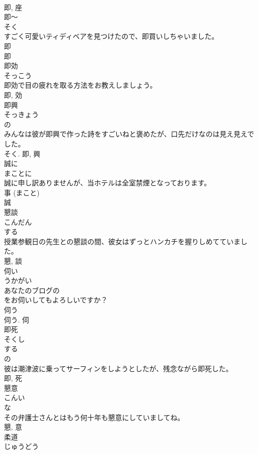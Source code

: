 \documentclass[8pt]{extreport}
\begin{document}
\begin{CJK}{UTF8}{min}
\\	即, 座	
\\	即〜	
\\	そく	
\\	すごく可愛いティディベアを見つけたので、即買いしちゃいました。	
\\	即 
\\	即	
\\	即効	
\\	そっこう	
\\	即効で目の疲れを取る方法をお教えしましょう。	
\\	即, 効	
\\	即興	
\\	そっきょう	
\\	の 
\\	みんなは彼が即興で作った詩をすごいねと褒めたが、口先だけなのは見え見えでした。	
\\	そく.	即, 興	
\\	誠に	
\\	まことに	
\\	誠に申し訳ありませんが、当ホテルは全室禁煙となっております。	
\\	事 (まこと) 
\\	誠	
\\	懇談	
\\	こんだん	
\\	する 
\\	授業参観日の先生との懇談の間、彼女はずっとハンカチを握りしめてていました。	
\\	懇, 談	
\\	伺い	
\\	うかがい	
\\	あなたのブログの
\\	をお伺いしてもよろしいですか？	
\\	伺う 
\\	伺う.	伺	
\\	即死	
\\	そくし	
\\	する 
\\	の 
\\	彼は潮津波に乗ってサーフィンをしようとしたが、残念ながら即死した。	
\\	即, 死	
\\	懇意	
\\	こんい	
\\	な 
\\	その弁護士さんとはもう何十年も懇意にしていましてね。	
\\	懇, 意	
\\	柔道	
\\	じゅうどう	

\end{CJK}
\end{document}
